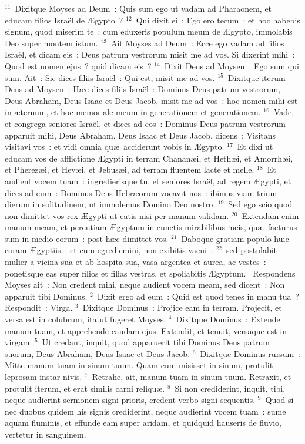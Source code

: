 ${}^{11}$~Dixitque Moyses ad Deum~: Quis sum ego ut vadam ad Pharaonem, et educam filios Isra\"el de \AE gypto~?
${}^{12}$~Qui dixit ei~: Ego ero tecum~: et hoc habebis signum, quod miserim te~: cum eduxeris populum meum de \AE gypto, immolabis Deo super montem istum.
${}^{13}$~Ait Moyses ad Deum~: Ecce ego vadam ad filios Isra\"el, et dicam eis~: Deus patrum vestrorum misit me ad vos. Si dixerint mihi~: Quod est nomen ejus~? quid dicam eis~?
${}^{14}$~Dixit Deus ad Moysen~: Ego sum qui sum. Ait~: Sic dices filiis Isra\"el~: Qui est, misit me ad vos.
${}^{15}$~Dixitque iterum Deus ad Moysen~: H\ae c dices filiis Isra\"el~: Dominus Deus patrum vestrorum, Deus Abraham, Deus Isaac et Deus Jacob, misit me ad vos~: hoc nomen mihi est in \ae ternum, et hoc memoriale meum in generationem et generationem.
${}^{16}$~Vade, et congrega seniores Isra\"el, et dices ad eos~: Dominus Deus patrum vestrorum apparuit mihi, Deus Abraham, Deus Isaac et Deus Jacob, dicens~: Visitans visitavi vos~: et vidi omnia qu\ae\ acciderunt vobis in \AE gypto.
${}^{17}$~Et dixi ut educam vos de afflictione \AE gypti in terram Chanan\ae i, et Heth\ae i, et Amorrh\ae i, et Pherez\ae i, et Hev\ae i, et Jebus\ae i, ad terram fluentem lacte et melle.
${}^{18}$~Et audient vocem tuam~: ingredierisque tu, et seniores Isra\"el, ad regem \AE gypti, et dices ad eum~: Dominus Deus Hebr\ae orum vocavit nos~: ibimus viam trium dierum in solitudinem, ut immolemus Domino Deo nostro.
${}^{19}$~Sed ego scio quod non dimittet vos rex \AE gypti ut eatis nisi per manum validam.
${}^{20}$~Extendam enim manum meam, et percutiam \AE gyptum in cunctis mirabilibus meis, qu\ae\ facturus sum in medio eorum~: post h\ae c dimittet vos.
${}^{21}$~Daboque gratiam populo huic coram \AE gyptiis~: et cum egrediemini, non exibitis vacui~:
${}^{22}$~sed postulabit mulier a vicina sua et ab hospita sua, vasa argentea et aurea, ac vestes~: ponetisque eas super filios et filias vestras, et spoliabitis \AE gyptum.
~Respondens Moyses ait~: Non credent mihi, neque audient vocem meam, sed dicent~: Non apparuit tibi Dominus.
${}^{2}$~Dixit ergo ad eum~: Quid est quod tenes in manu tua~? Respondit~: Virga.
${}^{3}$~Dixitque Dominus~: Projice eam in terram. Projecit, et versa est in colubrum, ita ut fugeret Moyses.
${}^{4}$~Dixitque Dominus~: Extende manum tuam, et apprehende caudam ejus. Extendit, et tenuit, versaque est in virgam.
${}^{5}$~Ut credant, inquit, quod apparuerit tibi Dominus Deus patrum suorum, Deus Abraham, Deus Isaac et Deus Jacob.
${}^{6}$~Dixitque Dominus rursum~: Mitte manum tuam in sinum tuum. Quam cum misisset in sinum, protulit leprosam instar nivis.
${}^{7}$~Retrahe, ait, manum tuam in sinum tuum. Retraxit, et protulit iterum, et erat similis carni reliqu\ae .
${}^{8}$~Si non crediderint, inquit, tibi, neque audierint sermonem signi prioris, credent verbo signi sequentis.
${}^{9}$~Quod si nec duobus quidem his signis crediderint, neque audierint vocem tuam~: sume aquam fluminis, et effunde eam super aridam, et quidquid hauseris de fluvio, vertetur in sanguinem.


